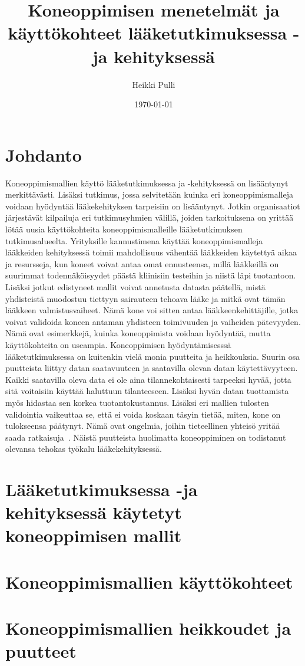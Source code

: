 \documentclass[finnish,twoside,censored,essay,sw-line]{HYthesisML}
\title{Koneoppimisen menetelmät ja käyttökohteet lääketutkimuksessa -ja kehityksessä}
\author{Heikki Pulli}
\date{\today}
\begin{document}
\maketitle

\mytableofcontents
\mainmatter

\chapter{Johdanto}

Koneoppimismallien käyttö lääketutkimuksessa ja -kehityksessä on lisääntynyt merkittävästi. Lisäksi tutkimus, jossa selvitetään kuinka eri koneoppimismalleja voidaan hyödyntää lääkekehityksen tarpeisiin on lisääntynyt.
Jotkin organisaatiot järjestävät kilpailuja eri tutkimusyhmien välillä, joiden tarkoituksena on yrittää lötää uusia käyttökohteita koneoppimismalleille lääketutkimuksen tutkimusalueelta.
Yrityksille kannustimena käyttää koneoppimismalleja lääkkeiden kehityksessä toimii mahdollisuus vähentää lääkkeiden käytettyä aikaa ja resursseja, kun koneet voivat antaa omat ennusteensa, millä lääkkeillä on
suurimmat todennäköisyydet päästä kliinisiin testeihin ja niistä läpi tuotantoon. Lisäksi jotkut edistyneet mallit voivat annetusta datasta päätellä, mistä yhdisteistä muodostuu tiettyyn sairauteen tehoava lääke
ja mitkä ovat tämän lääkkeen valmistusvaiheet. Nämä kone voi sitten antaa lääkkeenkehittäjille, jotka voivat validoida koneen antaman yhdisteen toimivuuden ja vaiheiden pätevyyden. Nämä ovat esimerkkejä, kuinka koneoppimista
voidaan hyödyntää, mutta käyttökohteita on useampia. Koneoppimisen hyödyntämisesssä lääketutkimuksessa on kuitenkin vielä monia puutteita ja heikkouksia. Suurin osa  puutteista liittyy datan saatavuuteen ja saatavilla
olevan datan käytettävyyteen. Kaikki saatavilla oleva data ei ole aina tilannekohtaisesti tarpeeksi hyvää, jotta sitä voitaisiin käyttää haluttuun tilanteeseen. Lisäksi hyvän datan tuottamista myös hidastaa sen korkea tuotantokustannus.
Lisäksi eri mallien tulosten validointia vaikeuttaa se, että ei voida koskaan täsyin tietää, miten, kone on tulokseensa päätynyt. Nämä ovat ongelmia, joihin tieteellinen yhteisö yritää saada ratkaisuja~\cite{VamathevanJessica2019Aoml}.
Näistä puutteista huolimatta koneoppiminen on todistanut olevansa tehokas työkalu lääkekehityksessä.

\chapter{Lääketutkimuksessa -ja kehityksessä käytetyt koneoppimisen mallit}

\chapter{Koneoppimismallien käyttökohteet}

\chapter{Koneoppimismallien heikkoudet ja puutteet}

\cleardoublepage
{}
{}
\printbibliography

\backmatter
\end{document}
